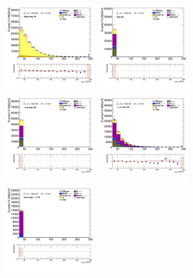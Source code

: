 		\begin{figure}[!htp]
			\begin{center}    
			\includegraphics[width=0.35\textwidth]{chapters/chapter6_HPlus/images/taulep/mu_0_pt_DILEP_BTAG.png}
			\includegraphics[width=0.35\textwidth]{chapters/chapter6_HPlus/images/taulep/mu_0_pt_ZEE.png} \\
			\includegraphics[width=0.35\textwidth]{chapters/chapter6_HPlus/images/taulep/mu_0_pt_TAUEL_BVETO.png} 
			\includegraphics[width=0.35\textwidth]{chapters/chapter6_HPlus/images/taulep/mu_0_pt_TAUMU_BVETO.png} \\
			\includegraphics[width=0.35\textwidth]{chapters/chapter6_HPlus/images/taulep/mu_0_pt_SS_TAUEL.png} 

\end{center}
\end{figure}
